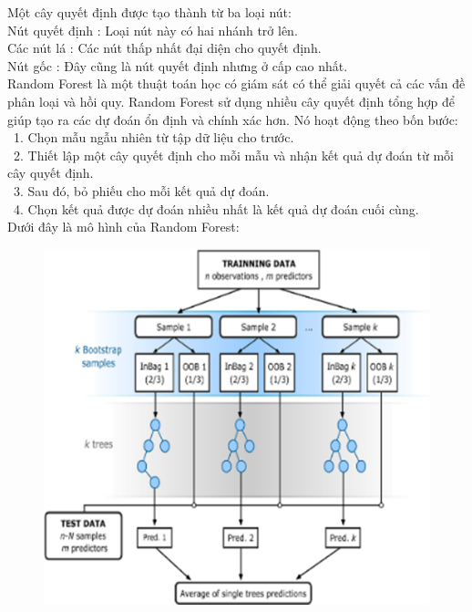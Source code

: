 \documentclass[conference]{IEEEtran}
\begin{document}
Một cây quyết định được tạo thành từ ba loại nút:\\
	\indent Nút quyết định : Loại nút này có hai nhánh trở lên. \\
	\indent Các nút lá : Các nút thấp nhất đại diện cho quyết định. \\
 	\indent Nút gốc : Đây cũng là nút quyết định nhưng ở cấp cao nhất. \\
Random Forest là một thuật toán học có giám sát có thể giải quyết cả các vấn đề phân loại và hồi quy. Random Forest sử dụng nhiều cây quyết định tổng hợp để giúp tạo ra các dự đoán ổn định và chính xác hơn. Nó hoạt động theo bốn bước:
\\
	\indent\textbullet\ 1.	Chọn mẫu ngẫu nhiên từ tập dữ liệu cho trước. \\
	\indent\textbullet\ 2.	Thiết lập một cây quyết định cho mỗi mẫu và nhận kết quả dự đoán từ mỗi cây quyết định. \\
 	\indent\textbullet\ 3.	Sau đó, bỏ phiếu cho mỗi kết quả dự đoán. \\
 	\indent\textbullet\ 4.	Chọn kết quả được dự đoán nhiều nhất là kết quả dự đoán cuối cùng. \\
Dưới đây là mô hình của Random Forest:
\begin{figure}[H]
    \centering
    \begin{minipage}{0.5\textwidth}
    \centering
    \includegraphics[width=1\textwidth]{Image/RF2.png}
    \label{fig:1}
    \end{minipage}
\end{figure}
\end{document}
